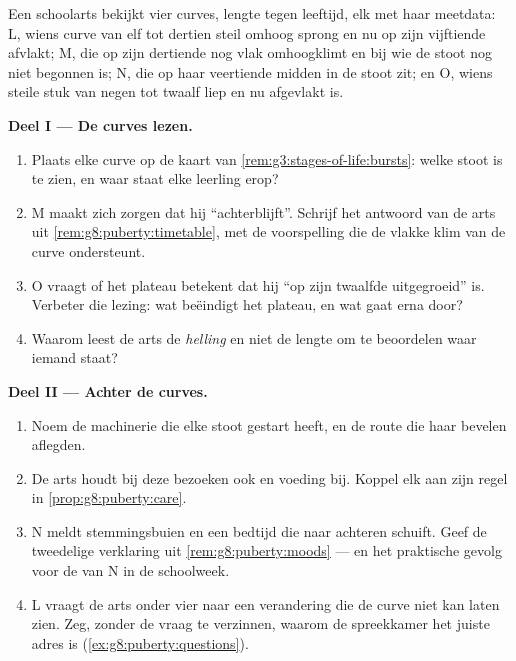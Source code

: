 \begin{problem}\label{pb:g8:puberty:1}
Een schoolarts bekijkt vier curves, lengte tegen leeftijd, elk met haar
meetdata: L, wiens curve van elf tot dertien steil omhoog sprong en nu op
zijn vijftiende afvlakt; M, die op zijn dertiende nog vlak omhoogklimt en
bij wie de stoot nog niet begonnen is; N, die op haar veertiende midden in
de stoot zit; en O, wiens steile stuk van negen tot twaalf liep en nu
afgevlakt is.

\medskip\noindent\textbf{Deel I --- De curves lezen.}
\begin{enumerate}
  \item Plaats elke curve op de kaart van
        \cref{rem:g3:stages-of-life:bursts}: welke stoot is te zien, en
        waar staat elke leerling erop?
  \item M maakt zich zorgen dat hij ``achterblijft''. Schrijf het antwoord
        van de arts uit \cref{rem:g8:puberty:timetable}, met de
        voorspelling die de vlakke klim van de curve ondersteunt.
  \item O vraagt of het plateau betekent dat hij ``op zijn twaalfde
        uitgegroeid'' is. Verbeter die lezing: wat beëindigt het plateau,
        en wat gaat erna door?
  \item Waarom leest de arts de \emph{helling} en niet de lengte om te
        beoordelen waar iemand staat?
\end{enumerate}

\medskip\noindent\textbf{Deel II --- Achter de curves.}
\begin{enumerate}[resume]
  \item Noem de machinerie die elke stoot gestart heeft, en de route die
        haar bevelen aflegden.
  \item De arts houdt bij deze bezoeken ook  en voeding bij. Koppel
        elk aan zijn regel in \cref{prop:g8:puberty:care}.
  \item N meldt stemmingsbuien en een bedtijd die naar achteren schuift.
        Geef de tweedelige verklaring uit
        \cref{rem:g8:puberty:moods} --- en het praktische gevolg voor de
         van N in de schoolweek.
  \item L vraagt de arts onder vier  naar een verandering die de curve
        niet kan laten zien. Zeg, zonder de vraag te verzinnen, waarom de
        spreekkamer het juiste adres is (\cref{ex:g8:puberty:questions}).
\end{enumerate}


\end{problem}
